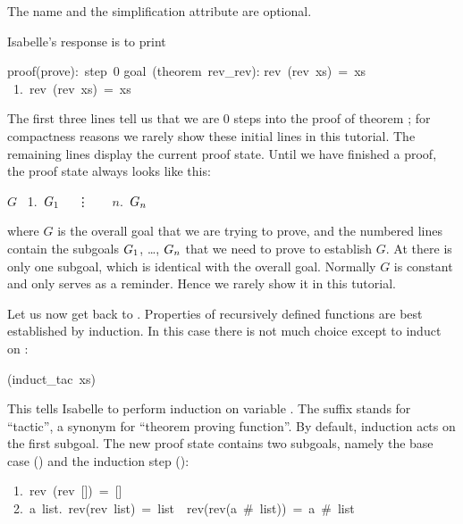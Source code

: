 \begin{isabelle}
\begin{isamarkuptxt}
\begin{itemize}
The name and the simplification attribute are optional.
\end{itemize}
Isabelle's response is to print
\begin{isabellepar}%
proof(prove):~step~0\isanewline
\isanewline
goal~(theorem~rev\_rev):\isanewline
rev~(rev~xs)~=~xs\isanewline
~1.~rev~(rev~xs)~=~xs
\end{isabellepar}%
The first three lines tell us that we are 0 steps into the proof of
theorem ; for compactness reasons we rarely show these
initial lines in this tutorial. The remaining lines display the current
proof state.
Until we have finished a proof, the proof state always looks like this:
\begin{isabellepar}%
$G$\isanewline
~1.~$G\sb{1}$\isanewline
~~\vdots~~\isanewline
~$n$.~$G\sb{n}$
\end{isabellepar}%
where $G$
is the overall goal that we are trying to prove, and the numbered lines
contain the subgoals $G\sb{1}$, \dots, $G\sb{n}$ that we need to prove to
establish $G$. At  there is only one subgoal, which is
identical with the overall goal.  Normally $G$ is constant and only serves as
a reminder. Hence we rarely show it in this tutorial.

Let us now get back to . Properties of recursively
defined functions are best established by induction. In this case there is
not much choice except to induct on :%
\end{isamarkuptxt}%
(induct\_tac\ xs)%
\begin{isamarkuptxt}%
\noindent{}%
This tells Isabelle to perform induction on variable . The suffix
 stands for ``tactic'', a synonym for ``theorem proving function''.
By default, induction acts on the first subgoal. The new proof state contains
two subgoals, namely the base case () and the induction step
():
\begin{isabellepar}%
~1.~rev~(rev~[])~=~[]\isanewline
~2.~{\isasymAnd}a~list.~rev(rev~list)~=~list~{\isasymLongrightarrow}~rev(rev(a~\#~list))~=~a~\#~list%
\end{isabellepar}%


\end{isamarkuptxt}
\end{isabelle}
